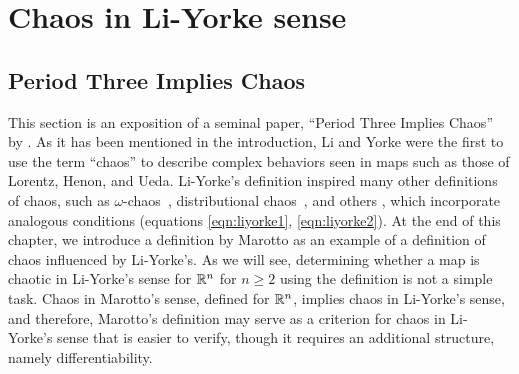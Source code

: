 \documentclass[10pt,draft,twoside]{book}
\begin{document}
\chapter{Chaos in Li-Yorke sense}
\label{chap:liyorke}

\section{Period Three Implies Chaos}
This section is an exposition of a seminal paper, ``Period Three Implies Chaos'' by \citet{li-yorke}.
As it has been mentioned in the introduction, Li and Yorke were the first to use the term ``chaos'' to describe complex behaviors seen in maps such as those of Lorentz, Henon, and Ueda.
Li-Yorke's definition inspired many other definitions of chaos, such as $\omega$-chaos~\citep{omegachaos}, distributional chaos~\citep{dchaos1}, and others \citep{genericchaos,densechaos,extremechaos}, which incorporate analogous conditions (equations \ref{eqn:liyorke1}, \ref{eqn:liyorke2}).
At the end of this chapter, we introduce a definition by Marotto as an example of a definition of chaos influenced by Li-Yorke's.
As we will see, determining whether a map is chaotic in Li-Yorke's sense for $\mathbb{R}^n$ for $n \geq 2$ using the definition is not a simple task.
Chaos in Marotto's sense, defined for $\mathbb{R}^n$, implies chaos in Li-Yorke's sense, and therefore, Marotto's definition may serve as a criterion for chaos in Li-Yorke's sense that is easier to verify, though it requires an additional structure, namely differentiability.

\end{document}
